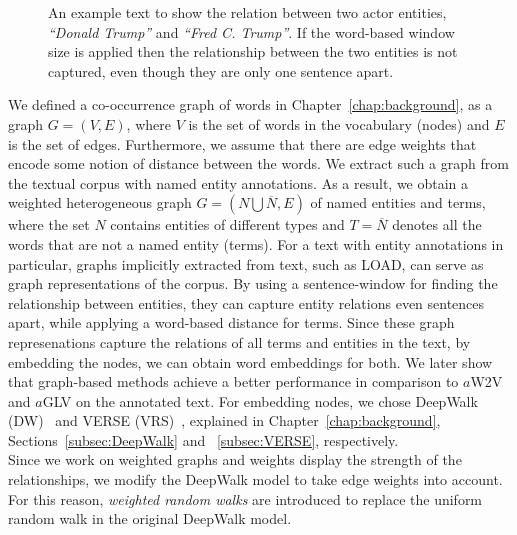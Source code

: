 \begin{figure}
\centering 
\resizebox{0.90\textwidth}{0.2\textwidth}{      

}
\caption{An example text to show the relation between two actor entities, \emph{``Donald Trump''} and \emph{``Fred C. Trump''}. If the word-based window size is applied then the relationship between the two entities is not captured, even though they are only one sentence apart.}
\label{fig:article_entities}
\end{figure}
\noindent
We defined a co-occurrence graph of words in Chapter~\ref{chap:background}, as a graph $G=(V,E)$, where $V$ is the set of words in the vocabulary (nodes) and $E$ is the set of edges. Furthermore, we assume that there are edge weights that encode some notion of distance between the words.
We extract such a graph from the textual corpus with named entity annotations. As a result, we obtain a weighted heterogeneous graph $G=(N\bigcup  \overline{N},E)$ of named entities and terms, where the set $N$ contains entities of different types and $ T=\overline{N}$ denotes all the words that are not a named entity (terms).
For a text with entity annotations in particular, graphs implicitly extracted from text, such as LOAD, can serve as graph representations of the corpus. By using a sentence-window for finding the relationship between entities, they can capture entity relations even sentences apart, while applying a word-based distance for terms. Since these graph represenations capture the relations of all terms and entities in the text, by embedding the nodes, we can obtain word embeddings for both. We later show that graph-based methods achieve a better performance in comparison to $a$W2V and $a$GLV on the annotated text. For embedding nodes, we chose DeepWalk (DW)~ and VERSE (VRS)~, explained in Chapter~\ref{chap:background}, Sections~\ref{subsec:DeepWalk} and ~\ref{subsec:VERSE}, respectively.\\
Since we work on weighted graphs and weights display the strength of the relationships, we modify the DeepWalk model to take edge weights into account. For this reason, \emph{weighted random walks} are introduced to replace the uniform random walk in the original DeepWalk model.
